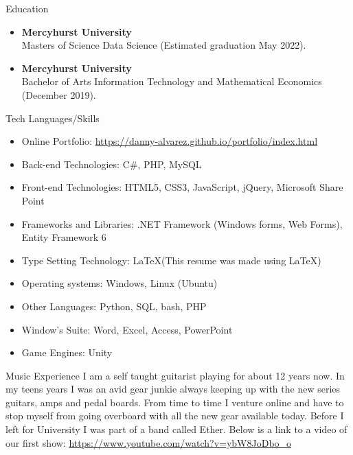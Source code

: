 \documentclass[11pt]{resume} %
\newcommand{\bold}[1]{\textbf{#1}}
\begin{document}
\begin{rSection}{Education}

\begin{itemize}
	\item\bold{Mercyhurst University}\\
	Masters of Science Data Science  (Estimated graduation May 2022).
	
	\item\bold{Mercyhurst University}\\
	Bachelor of Arts Information Technology and Mathematical Economics (December 2019).

\end{itemize}
\end{rSection}
\vspace{1in}
\begin{rSection}{Tech Languages/Skills}
\begin{itemize}
\item Online Portfolio: \url{https://danny-alvarez.github.io/portfolio/index.html}
\item Back-end Technologies: C\#, PHP, MySQL
\item Front-end Technologies: HTML5, CSS3, JavaScript, jQuery, Microsoft Share Point
\item Frameworks and Libraries: .NET Framework (Windows forms, Web Forms), Entity Framework 6
\item Type Setting Technology: \LaTeX\xspace (This resume was made using \LaTeX)
\item Operating systems: Windows, Linux (Ubuntu)
\item Other Languages: Python, SQL, bash, PHP
\item Window's Suite: Word, Excel, Access, PowerPoint
\item Game Engines: Unity
\end{itemize}
\end{rSection}
\begin{rSection}{Music Experience}
	I am a self taught guitarist playing for about 12 years now. In my teens years I was an avid gear junkie always keeping up with the new series guitars, amps and pedal boards. From time to time I venture online and have to stop myself from going overboard with all the new gear available today. Before I left for University I was part of a band called Ether. Below is a link to a video of our first show:
	\url{https://www.youtube.com/watch?v=ybW8JoDbo_o}
\end{rSection}
\end{document}
